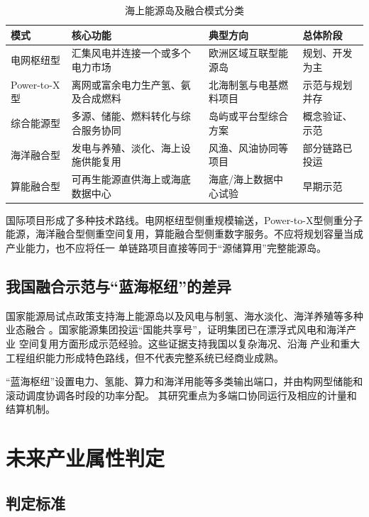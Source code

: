 \begin{table}[H]
\centering
\caption{海上能源岛及融合模式分类}
\label{tab:c2-international-modes}
\begin{tabularx}{\textwidth}{p{2.4cm} X X p{2.4cm}}
\toprule
模式 & 核心功能 & 典型方向 & 总体阶段\\
\midrule
电网枢纽型 & 汇集风电并连接一个或多个电力市场 & 欧洲区域互联型能源岛 & 规划、开发为主\\
Power-to-X型 & 离网或富余电力生产氢、氨及合成燃料 & 北海制氢与电基燃料项目 & 示范与规划并存\\
综合能源型 & 多源、储能、燃料转化与综合服务协同 & 岛屿或平台型综合方案 & 概念验证、示范\\
海洋融合型 & 发电与养殖、淡化、海上设施供能复用 & 风渔、风油协同等项目 & 部分链路已投运\\
算能融合型 & 可再生能源直供海上或海底数据中心 & 海底/海上数据中心试验 & 早期示范\\
\bottomrule
\end{tabularx}
\end{table}

国际项目形成了多种技术路线。电网枢纽型侧重规模输送，Power-to-X型侧重分子能源，海洋融合型侧重空间复用，算能融合型侧重数字服务。不应将规划容量当成产业能力，也不应将任一
单链路项目直接等同于“源储算用”完整能源岛。

\subsection{我国融合示范与“蓝海枢纽”的差异}

国家能源局试点政策支持海上能源岛以及风电与制氢、海水淡化、海洋养殖等多种业态融合
\cite{nea-demo}。国家能源集团投运“国能共享号”，证明集团已在漂浮式风电和海洋产业
空间复用方面形成示范经验\cite{chnenergy-sharing}。这些证据支持我国以复杂海况、沿海
产业和重大工程组织能力形成特色路线，但不代表完整系统已经商业成熟。

“蓝海枢纽”设置电力、氢能、算力和海洋用能等多类输出端口，并由构网型储能和滚动调度协调各时段的功率分配。
其研究重点为多端口协同运行及相应的计量和结算机制。

\section{未来产业属性判定}

\subsection{判定标准}

